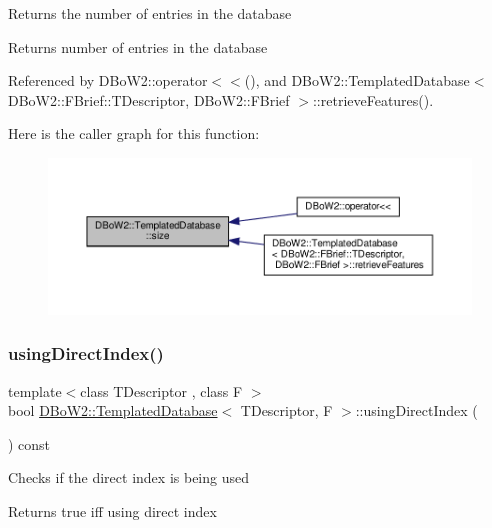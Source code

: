 Returns the number of entries in the database \begin{DoxyReturn}{Returns}
number of entries in the database 
\end{DoxyReturn}


Referenced by D\+Bo\+W2\+::operator$<$$<$(), and D\+Bo\+W2\+::\+Templated\+Database$<$ D\+Bo\+W2\+::\+F\+Brief\+::\+T\+Descriptor, D\+Bo\+W2\+::\+F\+Brief $>$\+::retrieve\+Features().

Here is the caller graph for this function\+:\nopagebreak
\begin{figure}[H]
\begin{center}
\leavevmode
\includegraphics[width=350pt]{classDBoW2_1_1TemplatedDatabase_a5c30e54458f694aef1941a0dec193d4d_icgraph}
\end{center}
\end{figure}
\mbox{\label{classDBoW2_1_1TemplatedDatabase_ad0fbf387b5707d6da34f0df05dc87401}} 
\subsubsection{\texorpdfstring{using\+Direct\+Index()}{usingDirectIndex()}}
{\footnotesize\ttfamily template$<$class T\+Descriptor , class F $>$ \\
bool \hyperlink{classDBoW2_1_1TemplatedDatabase}{D\+Bo\+W2\+::\+Templated\+Database}$<$ T\+Descriptor, F $>$\+::using\+Direct\+Index (\begin{DoxyParamCaption}{ }\end{DoxyParamCaption}) const\hspace{0.3cm}{\ttfamily [inline]}}

Checks if the direct index is being used \begin{DoxyReturn}{Returns}
true iff using direct index 
\end{DoxyReturn}


